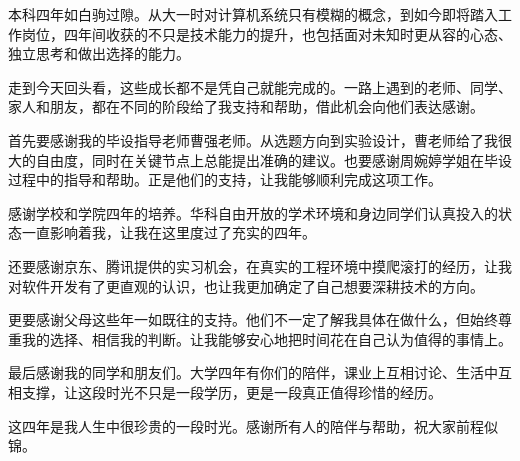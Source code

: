 \acknowledgement

本科四年如白驹过隙。从大一时对计算机系统只有模糊的概念，到如今即将踏入工作岗位，四年间收获的不只是技术能力的提升，也包括面对未知时更从容的心态、独立思考和做出选择的能力。

走到今天回头看，这些成长都不是凭自己就能完成的。一路上遇到的老师、同学、家人和朋友，都在不同的阶段给了我支持和帮助，借此机会向他们表达感谢。

首先要感谢我的毕设指导老师曹强老师。从选题方向到实验设计，曹老师给了我很大的自由度，同时在关键节点上总能提出准确的建议。也要感谢周婉婷学姐在毕设过程中的指导和帮助。正是他们的支持，让我能够顺利完成这项工作。

感谢学校和学院四年的培养。华科自由开放的学术环境和身边同学们认真投入的状态一直影响着我，让我在这里度过了充实的四年。

还要感谢京东、腾讯提供的实习机会，在真实的工程环境中摸爬滚打的经历，让我对软件开发有了更直观的认识，也让我更加确定了自己想要深耕技术的方向。

更要感谢父母这些年一如既往的支持。他们不一定了解我具体在做什么，但始终尊重我的选择、相信我的判断。让我能够安心地把时间花在自己认为值得的事情上。

最后感谢我的同学和朋友们。大学四年有你们的陪伴，课业上互相讨论、生活中互相支撑，让这段时光不只是一段学历，更是一段真正值得珍惜的经历。

这四年是我人生中很珍贵的一段时光。感谢所有人的陪伴与帮助，祝大家前程似锦。

